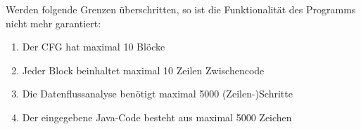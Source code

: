 Werden folgende Grenzen überschritten, so ist die Funktionalität des Programms nicht mehr garantiert:
\begin{enumerate}[label=(\alph*)]
\item Der CFG hat maximal 10 Blöcke
\item Jeder Block beinhaltet maximal 10 Zeilen Zwischencode
\item Die Datenflussanalyse benötigt maximal 5000 (Zeilen-)Schritte
\item Der eingegebene Java-Code besteht aus maximal 5000 Zeichen
\end{enumerate}
